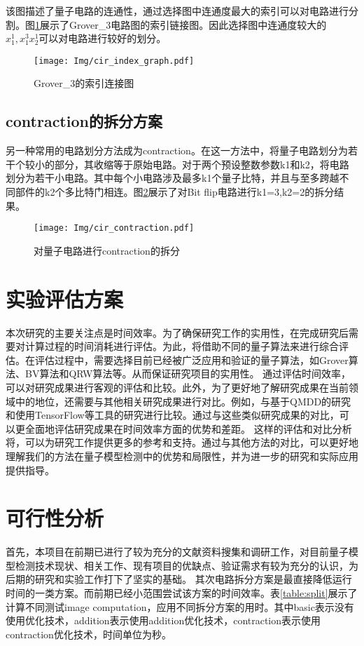 该图描述了量子电路的连通性，通过选择图中连通度最大的索引可以对电路进行分割。图\ref{fig:addition}展示了Grover\_3电路图的索引链接图。因此选择图中连通度较大的$x_1^1,x_1^3x_2^1$可以对电路进行较好的划分。
 
\begin{figure}[!htbp]
	\centering
	\texttt{[image: Img/cir\_index\_graph.pdf]}
	\caption{Grover\_3的索引连接图}
	\label{fig:addition}
\end{figure} 
\subsection{contraction的拆分方案}\label{contraction}
另一种常用的电路划分方法成为contraction。在这一方法中，将量子电路划分为若干个较小的部分，其收缩等于原始电路。对于两个预设整数参数k1和k2，将电路划分为若干小电路。其中每个小电路涉及最多k1个量子比特，并且与至多跨越不同部件的k2个多比特门相连。图\ref{fig:contraction}展示了对Bit flip电路进行k1=3,k2=2的拆分结果。
\begin{figure}[!htbp]
	\centering
	\texttt{[image: Img/cir\_contraction.pdf]}
	\caption{对量子电路进行contraction的拆分}
	\label{fig:contraction}
\end{figure} 

\section{实验评估方案}
本次研究的主要关注点是时间效率。为了确保研究工作的实用性，在完成研究后需要对计算过程的时间消耗进行评估。为此，将借助不同的量子算法来进行综合评估。在评估过程中，需要选择目前已经被广泛应用和验证的量子算法，如Grover算法、BV算法和QRW算法等。从而保证研究项目的实用性。
通过评估时间效率，可以对研究成果进行客观的评估和比较。此外，为了更好地了解研究成果在当前领域中的地位，还需要与其他相关研究成果进行对比。例如，与基于QMDD的研究和使用TensorFlow等工具的研究进行比较。通过与这些类似研究成果的对比，可以更全面地评估研究成果在时间效率方面的优势和差距。
这样的评估和对比分析将，可以为研究工作提供更多的参考和支持。通过与其他方法的对比，可以更好地理解我们的方法在量子模型检测中的优势和局限性，并为进一步的研究和实际应用提供指导。
\section{可行性分析}
首先，本项目在前期已进行了较为充分的文献资料搜集和调研工作，对目前量子模型检测技术现状、相关工作、现有项目的优缺点、验证需求有较为充分的认识，为后期的研究和实验工作打下了坚实的基础。
其次电路拆分方案是最直接降低运行时间的一类方案。而前期已经小范围尝试该方案的时间效率。表\ref{table:split}展示了计算不同测试image computation，应用不同拆分方案的用时。其中basic表示没有使用优化技术，addition表示使用addition优化技术，contraction表示使用contraction优化技术，时间单位为秒。

